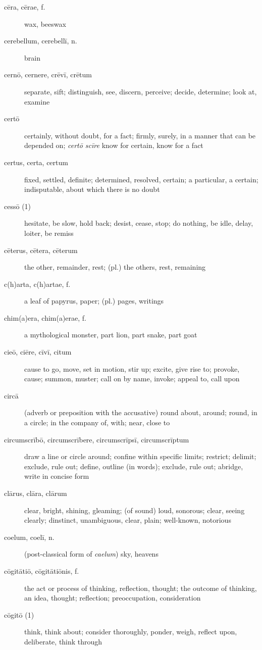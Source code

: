\begin{description}
    \item[cēra, cērae, f.] wax, beeswax
    \item[cerebellum, cerebellī, n.] brain
    \item[cernō, cernere, crēvī, crētum] separate, sift; distinguish, see, discern, perceive; decide, determine; look at, examine
    \item[certō] certainly, without doubt, for a fact; firmly, surely, in a manner that can be depended on; \textit{certō scīre} know for certain, know for a fact
    \item[certus, certa, certum] fixed, settled, definite; determined, resolved, certain; a particular, a certain; indisputable, about which there is no doubt
    \item[cessō (1)] hesitate, be slow, hold back; desist, cease, stop; do nothing, be idle, delay, loiter, be remiss
    \item[cēterus, cētera, cēterum] the other, remainder, rest; (pl.) the others, rest, remaining
    \item[c(h)arta, c(h)artae, f.]  a leaf of papyrus, paper; (pl.) pages, writings
    \item[chim(a)era, chim(a)erae, f.] a mythological monster, part lion, part snake, part goat
    \item[cieō, ciēre, cīvī, citum] cause to go, move, set in motion, stir up; excite, give rise to; provoke, cause; summon, muster; call on by name, invoke; appeal to, call upon
    \item[circā] (adverb or preposition with the accusative) round about, around; round, in a circle; in the company of, with; near, close to
    \item[circumscrībō, circumscrībere, circumscrīpsī, circumscrīptum] draw a line or circle around; confine within specific limits; restrict; delimit; exclude, rule out; define, outline (in words); exclude, rule out; abridge, write in concise form
    \item[clārus, clāra, clārum] clear, bright, shining, gleaming; (of sound) loud, sonorous; clear, seeing clearly; dinstinct, unambiguous, clear, plain; well-known, notorious
    \item[coelum, coelī, n.] (post-classical form of \textit{caelum}) sky, heavens
    \item[cōgitātiō, cōgitātiōnis, f.] the act or process of thinking, reflection, thought; the outcome of thinking, an idea, thought; reflection; preoccupation, consideration
    \item[cōgitō (1)] think, think about; consider thoroughly, ponder, weigh, reflect upon, deliberate, think through

\end{description}
